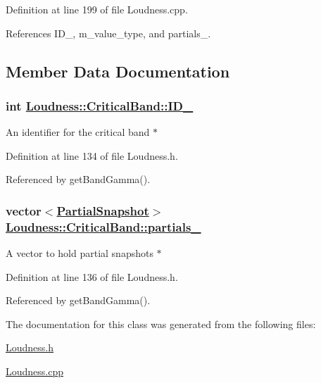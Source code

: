 Definition at line 199 of file Loudness.cpp.

References ID\_\-, m\_\-value\_\-type, and partials\_\-.

\subsection{Member Data Documentation}
\hypertarget{classLoudness_1_1CriticalBand_o0}{
\subsubsection[ID\_\-]{\setlength{\rightskip}{0pt plus 5cm}int \hyperlink{classLoudness_1_1CriticalBand_o0}{Loudness::Critical\-Band::ID\_\-}}}
\label{classLoudness_1_1CriticalBand_o0}


An identifier for the critical band $\ast$ 

Definition at line 134 of file Loudness.h.

Referenced by get\-Band\-Gamma().\hypertarget{classLoudness_1_1CriticalBand_o1}{
\subsubsection[partials\_\-]{\setlength{\rightskip}{0pt plus 5cm}vector$<$\hyperlink{classLoudness_1_1PartialSnapshot}{Partial\-Snapshot}$>$ \hyperlink{classLoudness_1_1CriticalBand_o1}{Loudness::Critical\-Band::partials\_\-}}}
\label{classLoudness_1_1CriticalBand_o1}


A vector to hold partial snapshots $\ast$ 

Definition at line 136 of file Loudness.h.

Referenced by get\-Band\-Gamma().

The documentation for this class was generated from the following files:\begin{CompactItemize}
\item 
\hyperlink{Loudness_8h}{Loudness.h}\item 
\hyperlink{Loudness_8cpp}{Loudness.cpp}\end{CompactItemize}
